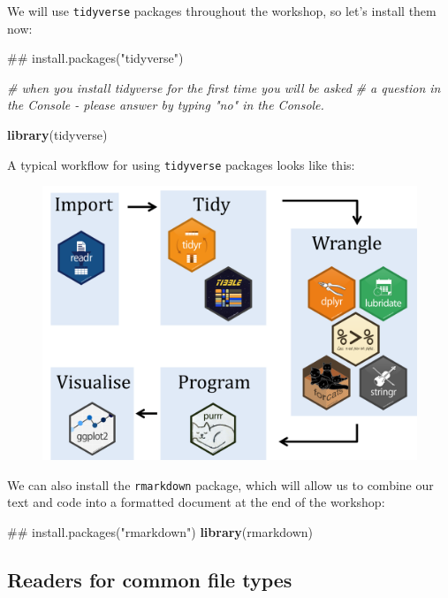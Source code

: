 \documentclass[]{book}
\newenvironment{Shaded}{\begin{snugshade}}{\end{snugshade}}
\newcommand{\KeywordTok}[1]{\textcolor[rgb]{0.13,0.29,0.53}{\textbf{#1}}}
\newcommand{\CommentTok}[1]{\textcolor[rgb]{0.56,0.35,0.01}{\textit{#1}}}
\newcommand{\NormalTok}[1]{#1}
\begin{document}
We will use \texttt{tidyverse} packages throughout the workshop, so
let's install them now:

\begin{Shaded}
\begin{Highlighting}[]
\NormalTok{## install.packages("tidyverse")}

\CommentTok{# when you install tidyverse for the first time you will be asked}
\CommentTok{# a question in the Console - please answer by typing "no" in the Console.}

\KeywordTok{library}\NormalTok{(tidyverse)}
\end{Highlighting}
\end{Shaded}

A typical workflow for using \texttt{tidyverse} packages looks like
this:

\begin{figure}
\centering
\includegraphics{R/Rintro/images/tidy_workflow.png}
\caption{}
\end{figure}

We can also install the \texttt{rmarkdown} package, which will allow us
to combine our text and code into a formatted document at the end of the
workshop:

\begin{Shaded}
\begin{Highlighting}[]
\NormalTok{## install.packages("rmarkdown")}
\KeywordTok{library}\NormalTok{(rmarkdown)}
\end{Highlighting}
\end{Shaded}

\subsection{Readers for common file
types}\label{readers-for-common-file-types}
\end{document}
